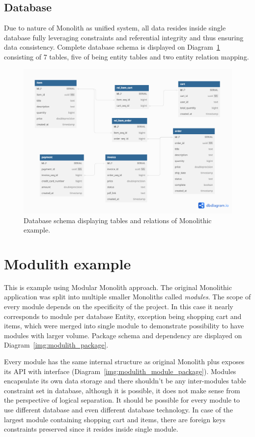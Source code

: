 \subsection{Database}
Due to nature of Monolith as unified system, all data resides inside single database fully leveraging constraints and referential integrity and thus ensuring data consistency. Complete database schema is displayed on Diagram~\ref{img:monolith_db_schema} consisting of 7 tables, five of being entity tables and two entity relation mapping.

\begin{figure}
    \centering
    \includegraphics[width=\textwidth]{images/monolith_db_schema.png}
    \caption{Database schema displaying tables and relations of Monolithic example. \label{img:monolith_db_schema}}
\end{figure}



\section{Modulith example}
This is example using Modular Monolith approach. The original Monolithic application was split into multiple smaller Monoliths called \textit{modules}. The scope of every module depends on the specificity of the project. In this case it nearly corresponds to module per database Entity, exception being shopping cart and items, which were merged into single module to demonstrate possibility to have modules with larger volume. Package schema and dependency are displayed on Diagram~\ref{img:modulith_package}.

Every module has the same internal structure as original Monolith plus exposes its API with interface (Diagram~\ref{img:modulith_module_package}). Modules encapsulate its own data storage and there shouldn't be any inter-modules table constraint set in database, although it is possible, it does not make sense from the perspective of logical separation. It should be possible for every module to use different database and even different database technology. In case of the largest module containing shopping cart and items, there are foreign keys constraints preserved since it resides inside single module.

